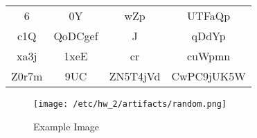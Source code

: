 \documentclass{article}
\begin{document}
\begin{center}
\begin{tabular}{cccc}
6 & 0Y & wZp & UTFaQp\\
c1Q & QoDCgef & J & qDdYp\\
xa3j & 1xeE & cr & cuWpmn\\
Z0r7m & 9UC & ZN5T4jVd & CwPC9jUK5W\\
\end{tabular}
\end{center}

\begin{figure}[ht]
    \centering
    \texttt{[image: /etc/hw\_2/artifacts/random.png]}
    \caption{Example Image}
\end{figure}
    
\end{document}
